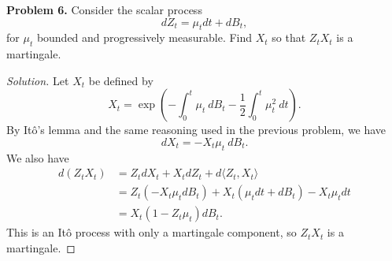 \documentclass[11pt,letterpaper]{report}
\newenvironment{solution}
{\begin{proof}[Solution]}
{\end{proof}}
\begin{document}
\noindent\textbf{Problem 6. }
Consider the scalar process
\[
dZ_t = \mu_tdt + dB_t,
\]
for $\mu_t$ bounded and progressively measurable. Find $X_t$ so that $Z_tX_t$ is a martingale.
\begin{solution}
	Let $X_t$ be defined by
	\[
	X_t = \exp\left(-\int_0^t\mu_t\ dB_t - \frac{1}{2}\int_0^t\mu_t^2\ dt \right).
	\]
	By It\^o's lemma and the same reasoning used in the previous problem, we have
	\[
	dX_t = -X_t\mu_t\ dB_t.
	\]
	We also have
	\begin{align*}
		d(Z_tX_t) &= Z_tdX_t + X_tdZ_t + d\langle Z_t, X_t\rangle\\
		&= Z_t(-X_t\mu_tdB_t) + X_t(\mu_tdt + dB_t) - X_t\mu_tdt\\
		&= X_t(1-Z_t\mu_t)dB_t.
	\end{align*}
	This is an It\^o process with only a martingale component, so $Z_tX_t$ is a martingale.
\end{solution}
\end{document}
